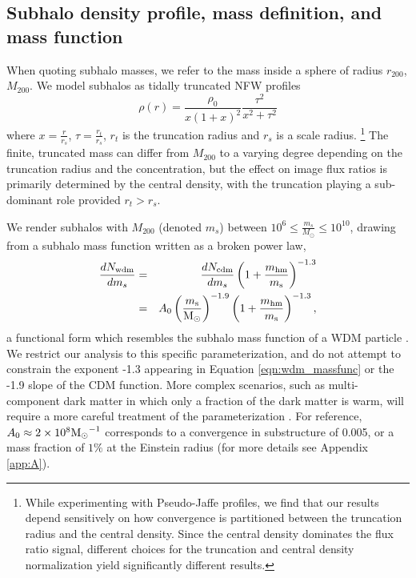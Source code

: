 \subsection{Subhalo density profile, mass definition, and mass function}
\label{ssec:substructure}
When quoting subhalo masses, we refer to the mass inside a sphere of radius $r_{200}$, $M_{200}$. We model subhalos as tidally truncated NFW profiles \cite{Baltz++09}
\begin{equation}
\label{eqn:massprofile}
\rho \left(r\right) = \frac{\rho_0}{x \left(1+x\right)^2} \frac{\tau^2}{x^2 + \tau^2}
\end{equation}
where $x = \frac{r}{r_s}$, $\tau = \frac{r_t}{r_s}$, $r_t$ is the truncation radius and $r_s$ is a scale radius. \footnote{While experimenting with Pseudo-Jaffe profiles, we find that our results depend sensitively on how convergence is partitioned between the truncation radius and the central density. Since the central density dominates the flux ratio signal, different choices for the truncation and central density normalization yield significantly different results.} The finite, truncated mass can differ from $M_{200}$ to a varying degree depending on the truncation radius and the concentration, but the effect on image flux ratios is primarily determined by the central density, with the truncation playing a sub-dominant role provided $r_t > r_s$. 

We render subhalos with $M_{200}$ (denoted $m_s$) between $10^6 \leq \frac{m_s}{M_{\odot}} \leq 10^{10}$, drawing from a subhalo mass function written as a broken power law, 
\begin{eqnarray}
\label{eqn:wdm_massfunc}
\nonumber \frac{dN_{\rm{wdm}}}{dm_s} & = & \frac{dN_{\rm{cdm}}}{dm_s} \left(1+\frac{m_{\rm{hm}}}{m_{\rm{s}}}\right)^{-1.3} \\
& = & A_0 \left(\frac{m_{\rm{s}}}{{\rm{M}_{\odot}}}\right)^{-1.9} \left(1+\frac{m_{\rm{hm}}}{m_{\rm{s}}}\right)^{-1.3},
\end{eqnarray}
a functional form which resembles the subhalo mass function of a WDM particle \cite{Schneider++12,Lovell++14}. We restrict our analysis to this specific parameterization, and do not attempt to constrain the exponent -1.3 appearing in Equation \ref{eqn:wdm_massfunc} or the -1.9 slope of the CDM function. More complex scenarios, such as multi-component dark matter in which only a fraction of the dark matter is warm, will require a more careful treatment of the parameterization \cite[see][]{Vegetti++18}. For reference, $A_0 \approx 2 \times 10^8 {\rm{M}_{\odot}}^{-1}$ corresponds to a convergence in substructure of 0.005, or a mass fraction of $1\%$ at the Einstein radius (for more details see Appendix \ref{app:A}). 

